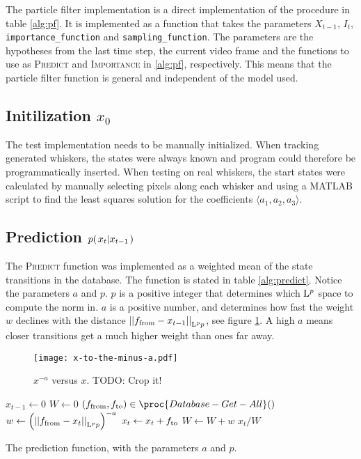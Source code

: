 The particle filter implementation is a direct implementation of the
procedure in table \ref{alg:pf}. It is implemented as a function that
takes the parameters $X_{t-1}$, $I_t$, \texttt{importance\_function} and
\texttt{sampling\_function}. The parameters are the hypotheses from
the last time step, the current video frame and the functions to use
as \textsc{Predict} and \textsc{Importance} in \ref{alg:pf},
respectively. This means that the particle filter function is general
and independent of the model used.

\subsection{Initilization $x_0$}
The test implementation needs to be manually initialized. When
tracking generated whiskers, the states were always known and program
could therefore be programmatically inserted. When testing on real
whiskers, the start states were calculated by manually
selecting pixels along each whisker and using a MATLAB script to find
the least squares solution for the coefficients $\langle a_1, a_2, a_3 \rangle$.

\subsection{Prediction $\cprobnext{x}$}
The \textsc{Predict} function was implemented as a weighted mean of the
state transitions in the database. The function is stated in table
\ref{alg:predict}. Notice the parameters $a$ and $p$. $p$ is a
positive integer that determines which $\Lp$ space to compute the norm
in. $a$ is a positive number, and determines how fast the weight $w$
declines with the distance $\Lpnorm[p]{\tf - x_{t-1}}$, see figure
\ref{fig:x-to-the-minus-a}. A high $a$ means closer transitions get a
much higher weight than ones far away.

\begin{figure}
  \centering
  \texttt{[image: x-to-the-minus-a.pdf]}
  \caption{$x^{-a}$ versus $x$. TODO: Crop it!}
  \label{fig:x-to-the-minus-a}
\end{figure}

\begin{table}
  \begin{codebox}
    \li $ x_{t-1} \gets 0$
    \li $ W \gets 0$
    \li \ForEach $(\tf, \tt) \in \proc{Database-Get-All}()$
    \li \Do
      \li $ w \gets \left(\Lpnorm[p]{\tf - x_t}\right)^{-a}$
      \li $ x_t \gets x_t + \tt$
      \li $ W \gets W + w$
    \End
    \li \Return $x_t / W$
  \end{codebox}
  \caption{The prediction function, with the parameters $a$ and $p$.}
  \label{alg:predict}
\end{table}



